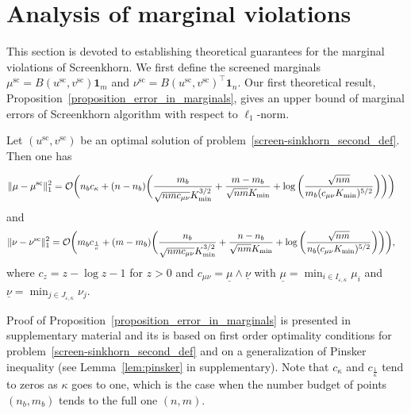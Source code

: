 
\section{Analysis of marginal violations} %
\label{sec:analysis_of_marginal_violations}

This section is devoted to establishing theoretical guarantees for the marginal violations of Screenkhorn. 
We first define the screened marginals $\mu^{\text{sc}} = B(u^{\text{sc}}, v^{\text{sc}}) \mathbf 1_m$ and $\nu^{\text{sc}} = B(u^{\text{sc}}, v^{\text{sc}})^\top \mathbf 1_n.$ 
Our first theoretical result, Proposition~\ref{proposition_error_in_marginals}, gives an upper bound of marginal errors of Screenkhorn algorithm with respect to $\ell_1$-norm.

\begin{proposition}
\label{proposition_error_in_marginals}
Let $(u^{\text{sc}}, v^{\text{sc}})$ be an optimal solution of problem~\eqref{screen-sinkhorn_second_def}.
Then one has 

\begin{align}
\label{marginal-error-mu}
{\|{\mu} -{\mu}^{\text{sc}}\|^2_1} = \mathcal{O}\bigg(n_bc_\kappa + (n- n_b) \bigg(\frac{m_b}{\sqrt{nmc_{\mu\nu}}K_{\min}^{3/2}} &+ \frac{m-m_b}{\sqrt{nm}K_{\min}}
 + \log\bigg(\frac{\sqrt{nm}}{m_b(c_{\mu\nu}K_{\min})^{5/2}} 
\bigg)\bigg)\bigg)
\end{align}
and 
\begin{align}
\label{marginal-error-nu}
{\|{\nu} -{\nu}^{\text{sc}}\|^2_1} = \mathcal{O}\bigg(m_bc_{\frac1\kappa} + (m- m_b) \bigg(\frac{n_b}{\sqrt{nmc_{\mu\nu}}K_{\min}^{3/2}} &+ \frac{n-n_b}{\sqrt{nm}K_{\min}}
 + \log\bigg(\frac{\sqrt{nm}}{n_b (c_{\mu\nu}K_{\min})^{5/2}}
\bigg)\bigg)\bigg),
\end{align}
where $c_z = z - \log z - 1$ for $z>0$ and $c_{\mu\nu} = \underline{\mu}\wedge \underline{\nu}$ with $\underline{\mu} = \min_{i\in I_{\varepsilon,\kappa}}\mu_i$ and $\underline{\nu} = \min_{j\in J_{\varepsilon,\kappa}}\nu_j$.

\end{proposition}
Proof of Proposition~\ref{proposition_error_in_marginals} is presented in supplementary material and its is based on first order optimality conditions for problem~\eqref{screen-sinkhorn_second_def} and on a generalization of Pinsker inequality (see Lemma~\ref{lem:pinsker} in supplementary).
Note that $c_\kappa$ and $c_{\frac 1\kappa}$ tend to zeros as $\kappa$ goes to one, which is the case when the number budget of points $(n_b,m_b)$ tends to the full one $(n,m)$.

